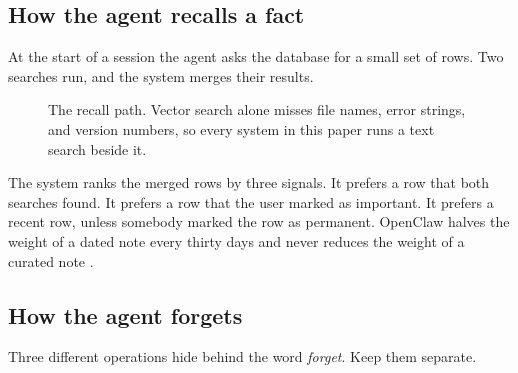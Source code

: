 \documentclass[11pt,a4paper]{article}
\begin{document}
\subsection{How the agent recalls a fact}

At the start of a session the agent asks the database for a small set of
rows. Two searches run, and the system merges their results.

\begin{figure}[H]
\centering
{}
\caption[The recall path]{The recall path. Vector search alone misses file names, error
strings, and version numbers, so every system in this paper runs a text
search beside it.}
\label{fig:recall}
\end{figure}

The system ranks the merged rows by three signals. It prefers a row that
both searches found. It prefers a row that the user marked as important.
It prefers a recent row, unless somebody marked the row as permanent.
OpenClaw halves the weight of a dated note every thirty days and never
reduces the weight of a curated note \cite{openclawMemCfg}.

\subsection{How the agent forgets}

Three different operations hide behind the word \emph{forget}. Keep them
separate.
\end{document}
